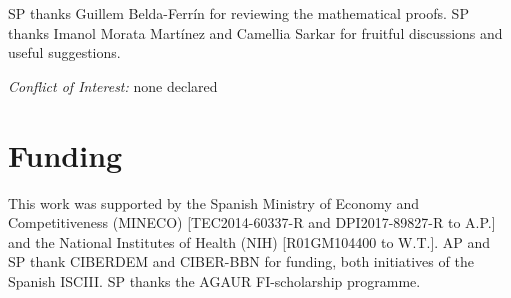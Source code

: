 \documentclass[final]{bioinfo}
\begin{document}
SP thanks Guillem Belda-Ferr\'in for reviewing the mathematical proofs.
SP thanks Imanol Morata Mart\'inez and Camellia Sarkar for fruitful discussions and useful suggestions. 

\textit{Conflict of Interest:} 
none declared

\section*{Funding}
This work was supported by the Spanish Ministry of Economy and Competitiveness (MINECO) [TEC2014-60337-R and DPI2017-89827-R to A.P.] and the National Institutes of Health (NIH) [R01GM104400 to W.T.]. 
AP and SP thank CIBERDEM and CIBER-BBN for funding, both initiatives of the Spanish ISCIII. 
SP thanks the AGAUR FI-scholarship programme.  


%
%
%
%
%
%
%

\end{document}
